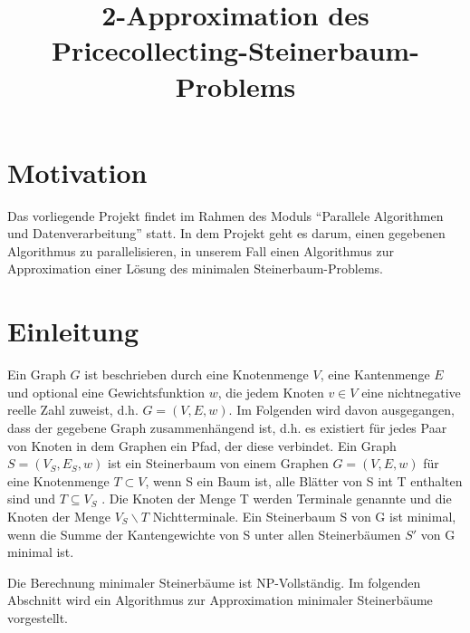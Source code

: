 \documentclass[a4paper,10pt]{article}
\title{2-Approximation des Pricecollecting-Steinerbaum-Problems}
\author{}
\begin{document}
\maketitle

\section{Motivation}
Das vorliegende Projekt findet im Rahmen des Moduls ``Parallele Algorithmen und Datenverarbeitung'' statt. In dem Projekt geht es darum, einen gegebenen
Algorithmus zu parallelisieren, in unserem Fall einen Algorithmus zur Approximation einer Lösung des minimalen Steinerbaum-Problems.

\section{Einleitung}
Ein Graph $G$ ist beschrieben durch eine Knotenmenge $V$, eine Kantenmenge $E$ und optional eine Gewichtsfunktion $w$, die jedem Knoten $v \in V$
eine nichtnegative reelle Zahl zuweist, d.h. $G = (V,E,w)$. Im Folgenden wird davon ausgegangen, dass der gegebene Graph zusammenhängend ist,
d.h. es existiert für jedes Paar von Knoten in dem Graphen ein Pfad, der diese verbindet.
Ein Graph $S = (V_S, E_S, w)$ ist ein Steinerbaum von einem Graphen $G = (V, E, w)$ für eine Knotenmenge $T \subset V$, wenn S ein Baum ist, alle Blätter
von S int T enthalten sind und $T \subseteq V_S$ \cite{steinerProblem}. Die Knoten der Menge T werden Terminale genannte und die Knoten der Menge
$V_S \backslash T$ Nichtterminale. Ein Steinerbaum S von G ist minimal, wenn die Summe der Kantengewichte von S
unter allen Steinerbäumen $S'$ von G minimal ist.

Die Berechnung minimaler Steinerbäume ist NP-Vollständig. Im folgenden Abschnitt wird ein Algorithmus zur Approximation minimaler Steinerbäume vorgestellt.
\end{document}
